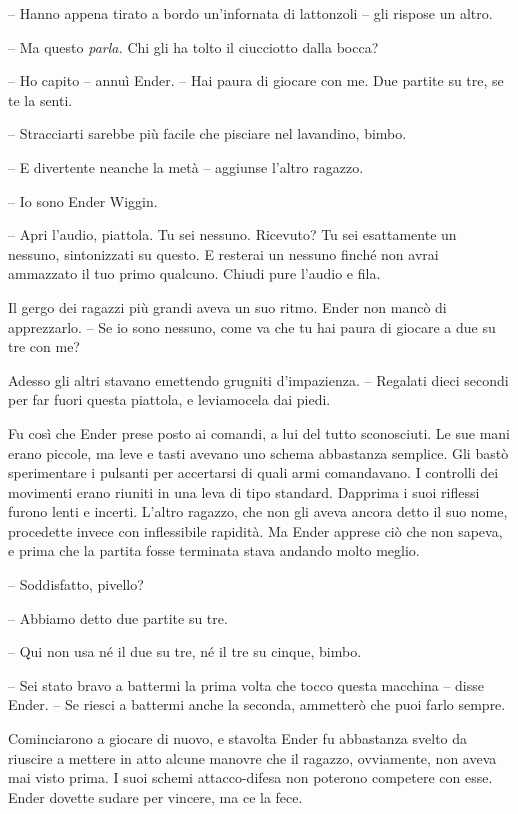 {-- Hanno appena tirato a bordo un'infornata di lattonzoli -- gli
	rispose un altro.}

{-- Ma questo \emph{parla.} Chi gli ha tolto il ciucciotto dalla bocca?}

{-- Ho capito -- annuì Ender. -- Hai paura di giocare con me. Due
	partite su tre, se te la senti.}

{-- Stracciarti sarebbe più facile che pisciare nel lavandino, bimbo.}

{-- E divertente neanche la metà -- aggiunse l'altro ragazzo.}

{-- Io sono Ender Wiggin.}

{-- Apri l'audio, piattola. Tu sei nessuno. Ricevuto? Tu sei esattamente
	un nessuno, sintonizzati su questo. E resterai un nessuno finché non
	avrai ammazzato il tuo primo qualcuno. Chiudi pure l'audio e fila.}

{Il gergo dei ragazzi più grandi aveva un suo ritmo. Ender non mancò di
	apprezzarlo. -- Se io sono nessuno, come va che tu hai paura di giocare
	a due su tre con me?}

{Adesso gli altri stavano emettendo grugniti d'impazienza. -- Regalati
	dieci secondi per far fuori questa piattola, e leviamocela dai piedi.}

{Fu così che Ender prese posto ai comandi, a lui del tutto sconosciuti.
	Le sue mani erano piccole, ma leve e tasti avevano uno schema abbastanza
	semplice. Gli bastò sperimentare i pulsanti per accertarsi di quali armi
	comandavano. I controlli dei movimenti erano riuniti in una leva di tipo
	standard. Dapprima i suoi riflessi furono lenti e incerti. L'altro
	ragazzo, che non gli aveva ancora detto il suo nome, procedette invece
	con inflessibile rapidità. Ma Ender apprese ciò che non sapeva, e prima
	che la partita fosse terminata stava andando molto meglio.}

{-- Soddisfatto, pivello?}

{-- Abbiamo detto due partite su tre.}

{-- Qui non usa né il due su tre, né il tre su cinque, bimbo.}

{-- Sei stato bravo a battermi la prima volta che tocco questa macchina
	-- disse Ender. -- Se riesci a battermi anche la seconda, ammetterò che
	puoi farlo sempre.}

{Cominciarono a giocare di nuovo, e stavolta Ender fu abbastanza svelto
	da riuscire a mettere in atto alcune manovre che il ragazzo, ovviamente,
	non aveva mai visto prima. I suoi schemi attacco-difesa non poterono
	competere con esse. Ender dovette sudare per vincere, ma ce la fece.}

